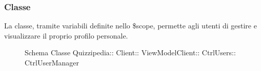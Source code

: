 \subsubsection{Classe }
La classe, tramite variabili definite nello \$scope, permette agli utenti di gestire e visualizzare il proprio profilo personale.
\begin{figure}[H]
\centering
\noindent{}
\caption[Schema Classe CtrlUserManager]{Schema Classe Quizzipedia:: Client:: ViewModelClient:: CtrlUsers:: CtrlUserManager}
\end{figure}
